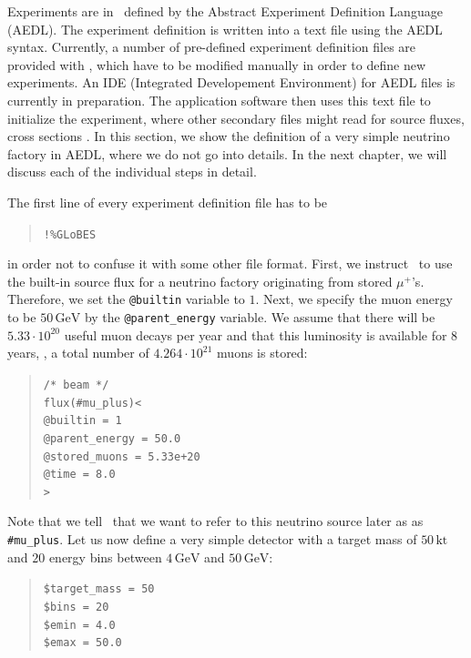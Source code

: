 Experiments are in \GLOBES\ defined by the Abstract Experiment Definition Language (AEDL). The experiment definition is written into a text file using the AEDL syntax. Currently, a number of pre-defined experiment definition files are provided with \GLOBES , which have to be modified manually in order to define new experiments. An IDE (Integrated Developement Environment) for AEDL files is currently in preparation. The application software then uses this text file to initialize the experiment, where other secondary files might read for source fluxes, cross sections \etc . In this section, we show the definition of a very simple neutrino factory in AEDL, where we do not go into details. In the next chapter, we will discuss each of the individual steps in detail.

The first line of every experiment definition file has to be
\begin{quote}
{\tt !\%GLoBES}
\end{quote}
in order not to confuse it with some other file format.
%
First, we instruct \GLOBES\ to use the built-in source flux for a neutrino factory
originating from stored $\mu^+$'s. Therefore, we set the {\tt @builtin} variable to $1$. Next, we specify the muon energy to be $50\,\mathrm{GeV}$ by the {\tt @parent\_energy} variable. We assume 
that there will be $5.33\cdot 10^{20}$ useful muon decays per year
and that this luminosity is available for $8$ years, \ie , a total number
of $ 4.264\cdot10^{21}$ muons is stored:
\begin{quote}
{\tt /* beam */}\\
{\tt flux(\#mu\_plus)<\\
\tb  @builtin = 1\\
\tb  @parent\_energy = 50.0\\
\tb  @stored\_muons = 5.33e+20\\
\tb  @time = 8.0\\
>}\\
\end{quote}
Note that we tell \GLOBES\ that we want to refer to this neutrino source later as as {\tt \#mu\_plus}. 
%
Let us now define a very simple detector with a target mass 
of $50\,\mathrm{kt}$ and $20$ energy bins between
$4\,\mathrm{GeV}$ and $50\,\mathrm{GeV}$: 
\begin{quote}
{\tt \$target\_mass = 50}\\
{\tt \$bins = 20}\\
{\tt \$emin = 4.0}\\
{\tt \$emax = 50.0}
\end{quote}

